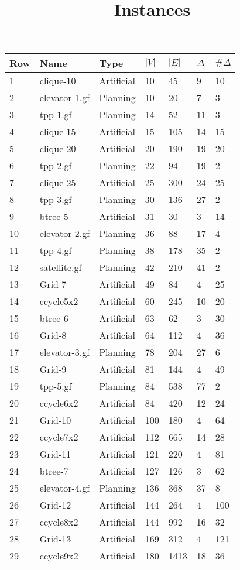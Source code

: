 \documentclass{article}
\title{Instances}
\begin{document}
\maketitle

\begin{longtable}{|l |l |l |l |l |l |l |}
\hline
Row&Name&Type&$|V|$&$|E|$&$\Delta$&$\# \Delta$\\
\hline
1&clique-10&Artificial&10&45&9&10\\
2&elevator-1.gf&Planning&10&20&7&3\\
3&tpp-1.gf&Planning&14&52&11&3\\
4&clique-15&Artificial&15&105&14&15\\
5&clique-20&Artificial&20&190&19&20\\
6&tpp-2.gf&Planning&22&94&19&2\\
7&clique-25&Artificial&25&300&24&25\\
8&tpp-3.gf&Planning&30&136&27&2\\
9&btree-5&Artificial&31&30&3&14\\
10&elevator-2.gf&Planning&36&88&17&4\\
11&tpp-4.gf&Planning&38&178&35&2\\
12&satellite.gf&Planning&42&210&41&2\\
13&Grid-7&Artificial&49&84&4&25\\
14&ccycle5x2&Artificial&60&245&10&20\\
15&btree-6&Artificial&63&62&3&30\\
16&Grid-8&Artificial&64&112&4&36\\
17&elevator-3.gf&Planning&78&204&27&6\\
18&Grid-9&Artificial&81&144&4&49\\
19&tpp-5.gf&Planning&84&538&77&2\\
20&ccycle6x2&Artificial&84&420&12&24\\
21&Grid-10&Artificial&100&180&4&64\\
22&ccycle7x2&Artificial&112&665&14&28\\
23&Grid-11&Artificial&121&220&4&81\\
24&btree-7&Artificial&127&126&3&62\\
25&elevator-4.gf&Planning&136&368&37&8\\
26&Grid-12&Artificial&144&264&4&100\\
27&ccycle8x2&Artificial&144&992&16&32\\
28&Grid-13&Artificial&169&312&4&121\\
29&ccycle9x2&Artificial&180&1413&18&36\\

\end{longtable}
\end{document}
